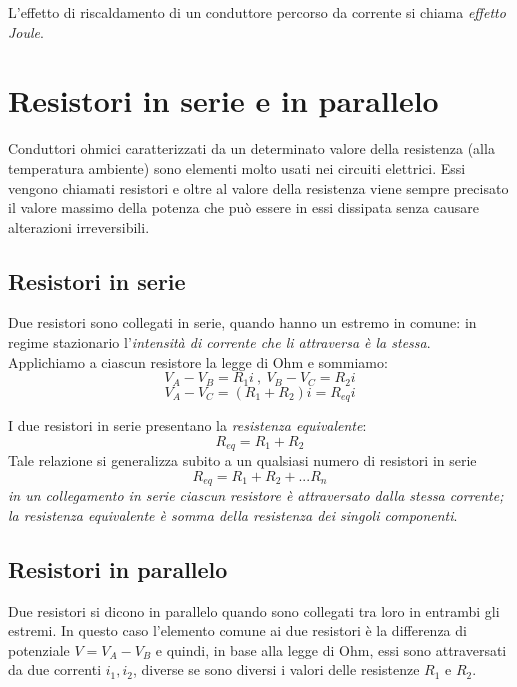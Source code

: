 \documentclass[class=book, crop=false, oneside, 12pt]{standalone}
\begin{document}
L'effetto di riscaldamento di un conduttore percorso da corrente si chiama \emph{effetto Joule}. 

\section{Resistori in serie e in parallelo}

Conduttori ohmici caratterizzati da un determinato valore della resistenza (alla temperatura ambiente) sono elementi molto usati nei circuiti elettrici. 
Essi vengono chiamati resistori e oltre al valore della resistenza viene sempre precisato il valore massimo della potenza che può essere in essi dissipata senza causare alterazioni irreversibili.

\subsection{Resistori in serie}

Due resistori sono collegati in serie, quando hanno un estremo in comune: in regime stazionario l'\emph{intensità di corrente che li attraversa è la stessa}. 
Applichiamo a ciascun resistore la legge di Ohm e sommiamo:
\begin{equation*}
    V_A - V_B = R_1 i \ , \ V_B - V_C = R_2 i 
\end{equation*}
\begin{equation*}
    V_A - V_C = \left(R_1 + R_2 \right) i = R_{eq} i
\end{equation*}

I due resistori in serie presentano la \emph{resistenza equivalente}:
\begin{equation*}
    R_{eq} = R_1 + R_2
\end{equation*}
Tale relazione si generalizza subito a un qualsiasi numero di resistori in serie
\begin{equation}
    R_{eq} = R_1 + R_2 + ... R_n
\end{equation}
\emph{in un collegamento in serie ciascun resistore è attraversato dalla stessa corrente; la resistenza equivalente è somma della resistenza dei singoli componenti}.

\subsection{Resistori in parallelo}

Due resistori si dicono in parallelo quando sono collegati tra loro in entrambi gli estremi. 
In questo caso l'elemento comune ai due resistori è la differenza di potenziale \(V = V_A -V_B\) e quindi, in base alla legge di Ohm, essi sono attraversati da due correnti \(i_1, i_2\), diverse se sono diversi i valori delle resistenze \(R_1\) e \(R_2\).
\end{document}
